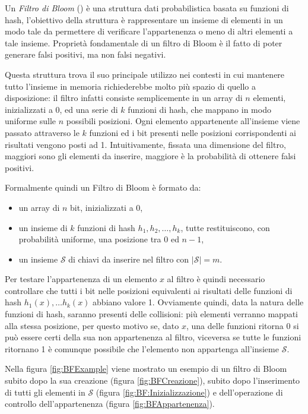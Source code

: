 \documentclass[../../main.tex]{subfiles}
\begin{document}
Un \textit{Filtro di Bloom} (\cite{Bloom1970SpacetimeTI}) è una struttura dati probabilistica basata su funzioni di hash, l'obiettivo della struttura è rappresentare un insieme di elementi in un modo tale da permettere di verificare l'appartenenza o meno di altri elementi a tale insieme. Proprietà fondamentale di un filtro di Bloom è il fatto di poter generare falsi positivi, ma non falsi negativi.

Questa struttura trova il suo principale utilizzo nei contesti in cui mantenere tutto l'insieme in memoria richiederebbe molto più spazio di quello a disposizione: il filtro infatti consiste semplicemente in un array di $n$ elementi, inizializzati a $0$, ed una serie di $k$ funzioni di hash, che mappano in modo uniforme sulle $n$ possibili posizioni. Ogni elemento appartenente all'insieme viene passato attraverso le $k$ funzioni ed i bit presenti nelle posizioni corrispondenti ai risultati vengono posti ad 1. Intuitivamente, fissata una dimensione del filtro, maggiori sono gli elementi da inserire, maggiore è la probabilità di ottenere falsi positivi.

Formalmente quindi un Filtro di Bloom è formato da:
    \begin{itemize}
        \item un array di $n$ bit, inizializzati a 0,
        \item un insieme di $k$ funzioni di hash $h_1, h_2, \dots, h_k$, tutte restituiscono, con probabilità uniforme, una posizione tra $0$ ed $n-1$,
        \item un insieme $\mathcal{S}$ di chiavi da inserire nel filtro con $|\mathcal{S}| = m$.
    \end{itemize}
Per testare l'appartenenza di un elemento $x$ al filtro è quindi necessario controllare che tutti i bit nelle posizioni equivalenti ai risultati delle funzioni di hash $h_1(x), \dots h_k(x)$ abbiano valore 1. Ovviamente quindi, data la natura delle funzioni di hash, saranno presenti delle collisioni: più elementi verranno mappati alla stessa posizione, per questo motivo se, dato $x$, una delle funzioni ritorna 0 si può essere certi della sua non appartenenza al filtro, viceversa se tutte le funzioni ritornano 1 è comunque possibile che l'elemento non appartenga all'insieme $\mathcal{S}$.

Nella figura \ref{fig:BFExample} viene mostrato un esempio di un filtro di Bloom subito dopo la sua creazione (figura \ref{fig:BFCreazione}), subito dopo l'inserimento di tutti gli elementi in $\mathcal{S}$ (figura \ref{fig:BF:Inizializzazione}) e dell'operazione di controllo dell'appartenenza (figura \ref{fig:BFAppartenenza}).
\end{document}
